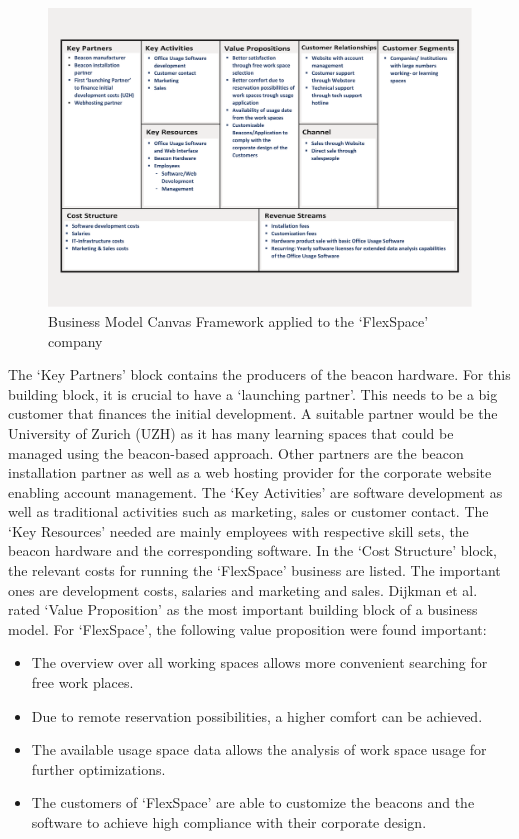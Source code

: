 			\begin{figure}[ht]
			    \begin{center}
			    \includegraphics[scale=0.4]{Talk11/use_case_dijkman.pdf}
			    \end{center}
			    \caption{Business Model Canvas Framework applied to the `FlexSpace' company}
			    \label{fig:bmc_flex}
			\end{figure}
		The `Key Partners' block contains the producers of the beacon hardware. For this building block, it is crucial to have a `launching partner'. This needs to be a big customer that finances the initial development. A suitable partner would be the University of Zurich (UZH) as it has many learning spaces that could be managed using the beacon-based approach. Other partners are the beacon installation partner as well as a web hosting provider for the corporate website enabling account management. The `Key Activities' are software development as well as traditional activities such as marketing, sales or customer contact. The `Key Resources' needed are mainly employees with respective skill sets, the beacon hardware and the corresponding software. In the `Cost Structure' block, the relevant costs for running the `FlexSpace' business are listed. The important ones are development costs, salaries and marketing and sales. Dijkman et al. \cite{dijkman} rated `Value Proposition' as the most important building block of a business model. For `FlexSpace', the following value proposition were found important:
		\vspace{-1em}
		\begin{itemize}
			\item The overview over all working spaces allows more convenient searching for free work places.
			\item Due to remote reservation possibilities, a higher comfort can be achieved. 
			\item The available usage space data allows the analysis of work space usage for further optimizations.
			\item The customers of `FlexSpace' are able to customize the beacons and the software to achieve high compliance with their corporate design.  
		\end{itemize}
